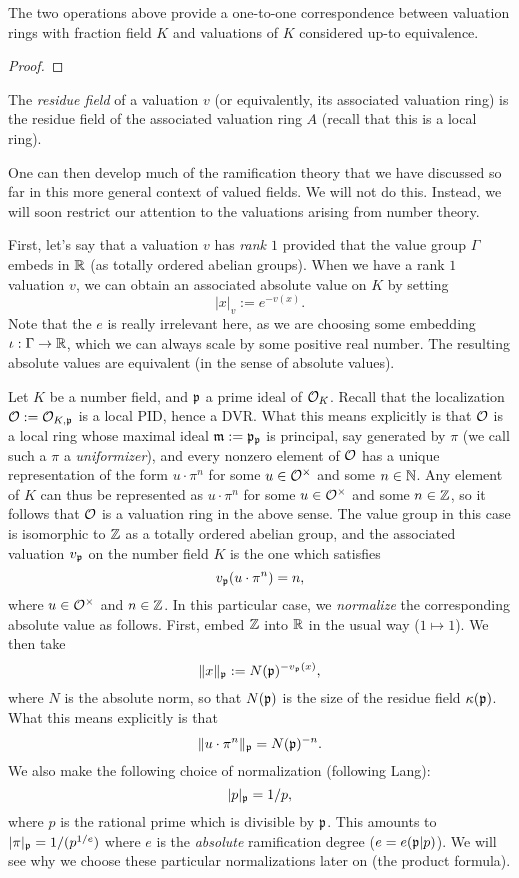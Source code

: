 \begin{lemma}
  The two operations above provide a one-to-one correspondence between valuation rings with fraction field $K$ and valuations of $K$ considered up-to equivalence.
\end{lemma}
\begin{proof}
\end{proof}

The \emph{residue field} of a valuation $v$ (or equivalently, its associated valuation ring) is the residue field of the associated valuation ring $A$ (recall that this is a local ring).

One can then develop much of the ramification theory that we have discussed so far in this more general context of valued fields.
We will not do this.
Instead, we will soon restrict our attention to the valuations arising from number theory.

First, let's say that a valuation $v$ has \emph{rank $1$} provided that the value group $\Gamma$ embeds in $\mathbb{R}$ (as totally ordered abelian groups).
When we have a rank $1$ valuation $v$, we can obtain an associated absolute value on $K$ by setting
\[ |x|_{v} := e^{-v(x)}. \]
Note that the $e$ is really irrelevant here, as we are choosing some embedding $\iota : \Gamma \to \mathbb{R}$, which we can always scale by some positive real number.
The resulting absolute values are equivalent (in the sense of absolute values).

Let $K$ be a number field, and $\mathfrak{p}$ a prime ideal of $\mathcal{O}_{K}$.
Recall that the localization $\mathcal{O} := \mathcal{O}_{K,\mathfrak{p}}$ is a local PID, hence a DVR.
What this means explicitly is that $\mathcal{O}$ is a local ring whose maximal ideal $\mathfrak{m} := \mathfrak{p}_{\mathfrak{p}}$ is principal, say generated by $\pi$ (we call such a $\pi$ a \emph{uniformizer}), and every nonzero element of $\mathcal{O}$ has a unique representation of the form $u \cdot \pi^{n}$ for some $u \in \mathcal{O}^{\times}$ and some $n \in \mathbb{N}$.
Any element of $K$ can thus be represented as $u \cdot \pi^{n}$ for some $u \in \mathcal{O}^{\times}$ and some $n \in \mathbb{Z}$, so it follows that $\mathcal{O}$ is a valuation ring in the above sense.
The value group in this case is isomorphic to $\mathbb{Z}$ as a totally ordered abelian group, and the associated valuation $v_{\mathfrak{p}}$ on the number field $K$ is the one which satisfies
\[ v_{\mathfrak{p}}(u \cdot \pi^{n}) = n, \]
where $u \in \mathcal{O}^{\times}$ and $n \in \mathbb{Z}$.
In this particular case, we \emph{normalize} the corresponding absolute value as follows.
First, embed $\mathbb{Z}$ into $\mathbb{R}$ in the usual way ($1 \mapsto 1$).
We then take
\[ \|x\|_{\mathfrak{p}} := N(\mathfrak{p})^{-v_{\mathfrak{p}}(x)}, \]
where $N$ is the absolute norm, so that $N(\mathfrak{p})$ is the size of the residue field $\kappa(\mathfrak{p})$.
What this means explicitly is that
\[ \|u \cdot \pi^{n}\|_{\mathfrak{p}} = N(\mathfrak{p})^{-n}. \]
We also make the following choice of normalization (following Lang):
\[ |p|_{\mathfrak{p}} = 1/p, \]
where $p$ is the rational prime which is divisible by $\mathfrak{p}$.
This amounts to $|\pi|_{\mathfrak{p}} = 1/(p^{1/e})$ where $e$ is the \emph{absolute} ramification degree ($e = e(\mathfrak{p}|p)$).
We will see why we choose these particular normalizations later on (the product formula).


